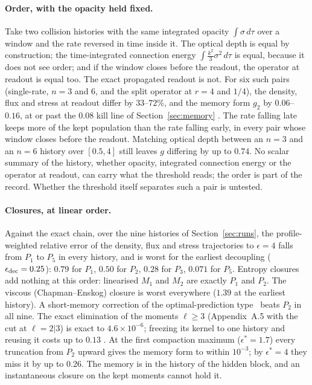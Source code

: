 \paragraph{Order, with the opacity held fixed.} Take two collision histories with the same integrated opacity $\int\sigma\,d\tau$ over a window and the rate reversed in time inside it. The optical depth is equal by construction; the time-integrated connection energy $\int\tfrac{k^2}{3}\sigma^2\,d\tau$ is equal, because it does not see order; and if the window closes before the readout, the operator at readout is equal too. The exact propagated readout is not. For six such pairs (single-rate, $n=3$ and $6$, and the split operator at $r=4$ and $1/4$), the density, flux and stress at readout differ by $33$--$72\%$, and the memory form $g_2$ by $0.06$--$0.16$, at or past the $0.08$ kill line of Section~\ref{sec:memory} . The rate falling late keeps more of the kept population than the rate falling early, in every pair whose window closes before the readout. Matching optical depth between an $n=3$ and an $n=6$ history over $[0.5,4]$ still leaves $g$ differing by up to $0.74$. No scalar summary of the history, whether opacity, integrated connection energy or the operator at readout, can carry what the threshold reads; the order is part of the record. Whether the threshold itself separates such a pair is untested.

\paragraph{Closures, at linear order.} Against the exact chain, over the nine histories of Section~\ref{sec:runs}, the profile-weighted relative error of the density, flux and stress trajectories to $\epsilon=4$ falls from $P_1$ to $P_5$ in every history, and is worst for the earliest decoupling ($\epsilon_{\rm dec}=0.25$): $0.79$ for $P_1$, $0.50$ for $P_2$, $0.28$ for $P_3$, $0.071$ for $P_5$. Entropy closures add nothing at this order: linearised $M_1$ and $M_2$ are exactly $P_1$ and $P_2$. The viscous (Chapman--Enskog) closure is worst everywhere ($1.39$ at the earliest history). A short-memory correction of the optimal-prediction type~\cite{SF} beats $P_2$ in all nine. The exact elimination of the moments $\ell\ge3$ (Appendix~A.5 with the cut at $\ell=2|3$) is exact to $4.6\times10^{-6}$; freezing its kernel to one history and reusing it costs up to $0.13$ . At the first compaction maximum ($\epsilon^\ast=1.7$) every truncation from $P_2$ upward gives the memory form to within $10^{-3}$; by $\epsilon^\ast=4$ they miss it by up to $0.26$. The memory is in the history of the hidden block, and an instantaneous closure on the kept moments cannot hold it.

